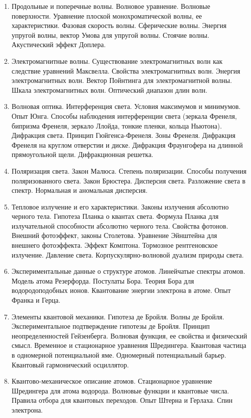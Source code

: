 \documentclass[12pt]{article}
\begin{document}
\begin{enumerate}
    \item Продольные и поперечные волны. Волновое уравнение. Волновые поверхности. Уравнение 
    плоской монохроматической волны, ее характеристики. Фазовая скорость волны. Сферические 
    волны. Энергия упругой волны, вектор Умова для упругой волны. Стоячие волны. Акустический 
    эффект Доплера. 

    \item Электромагнитные волны. Существование электромагнитных волн как следствие уравнений 
    Максвелла. Свойства электромагнитных волн. Энергия электромагнитных волн. Вектор 
    Пойнтинга для электромагнитной волны. Шкала электромагнитных волн. Оптический диапазон 
    длин волн. 

    \item Волновая оптика. Интерференция света. Условия максимумов и минимумов. Опыт Юнга. 
    Способы наблюдения интерференции света (зеркала Френеля, бипризма Френеля, зеркало 
    Ллойда, тонкие пленки, кольца Ньютона). Дифракция света. Принцип Гюйгенса-Френеля. Зоны 
    Френеля. Дифракция Френеля на круглом отверстии и диске. Дифракция Фраунгофера на 
    длинной прямоугольной щели. Дифракционная решетка. 
    
    \item Поляризация света. Закон Малюса. Степень поляризации. Способы получения 
    поляризованного света. Закон Брюстера. Дисперсия света. Разложение света в спектр. 
    Нормальная и аномальная дисперсия.

    \item Тепловое излучение и его характеристики. Законы излучения абсолютно черного тела. 
    Гипотеза Планка о квантах света. Формула Планка для излучательной способности абсолютно 
    черного тела. Свойства фотонов. Внешний фотоэффект, законы Столетова. Уравнение 
    Эйнштейна для внешнего фотоэффекта. Эффект Комптона. Тормозное рентгеновское излучение. 
    Давление света. Корпускулярно-волновой дуализм природы света.

    \item Экспериментальные данные о структуре атомов. Линейчатые спектры атомов. Модель атома 
    Резерфорда. Постулаты Бора. Теория Бора для водородоподобных ионов. Квантование энергии 
    электрона в атоме. Опыт Франка и Герца. 

    \item Элементы квантовой механики. Гипотеза де Бройля. Волны де Бройля. Экспериментальное 
    подтверждение гипотезы де Бройля. Принцип неопределенностей Гейзенберга. Волновая 
    функция, ее свойства и физический смысл. Временное и стационарное уравнения Шредингера. 
    Квантовая частица в одномерной потенциальной яме. Одномерный потенциальный барьер. 
    Квантовый гармонический осциллятор. 

    \item Квантово-механическое описание атомов. Стационарное уравнение Шредингера для атома 
    водорода. Волновые функции и квантовые числа. Правила отбора для квантовых переходов. 
    Опыт Штерна и Герлаха. Спин электрона.

\end{enumerate}

\end{document}
